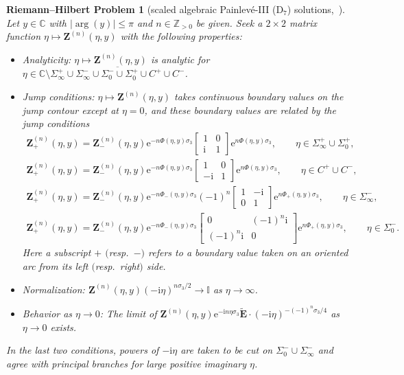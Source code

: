\documentclass[11pt]{article}
\numberwithin{equation}{section}
\numberwithin{equation}{section}
\newtheorem{rhp}[Theorem]{Riemann--Hilbert Problem}
 { \theoremstyle{definition}
\newtheorem{Definition}[Theorem]{Definition}
\newtheorem{Note}[Theorem]{Note}
\newtheorem{Example}[Theorem]{Example}
\newtheorem{Remark}[Theorem]{Remark} }
\begin{document}
\begin{rhp}[{scaled algebraic Painlev\'e-III (D$_7$) solutions,~\cite[Section~4.1]{BuckinghamM22}}]\label{rhp:Z}
Let $y\in\mathbb{C}$ with $|\arg(y)|\le\pi$ and $n\in\mathbb{Z}_{>0}$ be given. Seek a $2\times 2$ matrix function $\eta\mapsto\mathbf{Z}^{(n)}(\eta,y)$ with the following properties:
\begin{itemize}\itemsep=0pt
\item[]Analyticity: $\eta\mapsto\mathbf{Z}^{(n)}(\eta,y)$ is analytic for $\eta\in\mathbb{C}\setminus \overline{\Sigma_\infty^+\cup\Sigma_\infty^-\cup\Sigma_0^-\cup\Sigma_0^+\cup C^+\cup C^-}$.
\item[]Jump conditions: $\eta\mapsto \mathbf{Z}^{(n)}(\eta,y)$ takes continuous boundary values on the jump contour except at $\eta=0$, and these boundary values are related by the jump conditions
\begin{gather*}
\mathbf{Z}_+^{(n)}(\eta,y)=\mathbf{Z}^{(n)}_-(\eta,y)\mathrm{e}^{-n\Phi(\eta,y)\sigma_3}\begin{bmatrix}1&0\\\mathrm{i} & 1\end{bmatrix}\mathrm{e}^{n\Phi(\eta,y)\sigma_3},\qquad\eta\in\Sigma_\infty^+\cup\Sigma_0^+,
\\
\mathbf{Z}_+^{(n)}(\eta,y)=\mathbf{Z}^{(n)}_-(\eta,y)\mathrm{e}^{-n\Phi(\eta,y)\sigma_3}\begin{bmatrix}1&0\\-\mathrm{i} & 1\end{bmatrix}\mathrm{e}^{n\Phi(\eta,y)\sigma_3},\qquad\eta\in C^+\cup C^-,
\\
\mathbf{Z}_+^{(n)}(\eta,y)=\mathbf{Z}^{(n)}_-(\eta,y)\mathrm{e}^{-n\Phi_-(\eta,y)\sigma_3}(-1)^n\begin{bmatrix}1&-\mathrm{i} \\ 0 & 1\end{bmatrix}\mathrm{e}^{n\Phi_+(\eta,y)\sigma_3},\qquad\eta\in\Sigma_\infty^-,
\\
\mathbf{Z}_+^{(n)}(\eta,y)=\mathbf{Z}^{(n)}_-(\eta,y)\mathrm{e}^{-n\Phi_-(\eta,y)\sigma_3}\begin{bmatrix}0 & (-1)^n\mathrm{i}\\ (-1)^n\mathrm{i} & 0\end{bmatrix}
\mathrm{e}^{n\Phi_+(\eta,y)\sigma_3},\qquad\eta\in\Sigma_0^-.
\end{gather*}
Here a subscript $+$ $($resp.~$-)$ refers to a
boundary value taken on an oriented arc from its left $($resp.\ right$)$ side.
\item[]Normalization: $\mathbf{Z}^{(n)}(\eta,y)(-\mathrm{i}\eta)^{n\sigma_3/2}\to\mathbb{I}$ as $\eta\to\infty$.
\item[]Behavior as $\eta\to 0$: The limit of $\mathbf{Z}^{(n)}(\eta,y)\mathrm{e}^{-\mathrm{i} n\eta\sigma_3}\widetilde{\mathbf{E}}\cdot(-\mathrm{i}\eta)^{-(-1)^n\sigma_3/4}$ as $\eta\to 0$ exists.
\end{itemize}
In the last two conditions, powers of $-\mathrm{i}\eta$ are taken to be cut on $\Sigma_0^-\cup\Sigma_\infty^-$ and agree with principal branches for large positive imaginary $\eta$.
\end{rhp}
\end{document}
